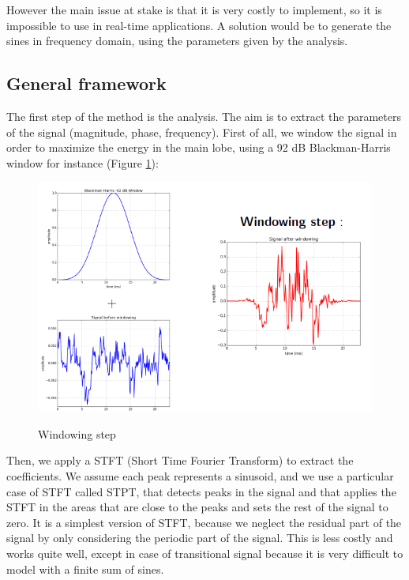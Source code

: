 \documentclass[]{article}
\begin{document}
\medskip
However the main issue at stake is that it is very costly to implement, so it is impossible to use in real-time applications. A solution would be to generate the sines in frequency domain, using the parameters given by the analysis.

\subsection{General framework}\label{sec:general-framework}

The first step of the method is the analysis. The aim is to extract the parameters of the signal (magnitude, phase, frequency).
First of all, we window the signal in order to maximize the energy in the main lobe, using a 92 dB Blackman-Harris window for instance (Figure \ref{windowing}):

\begin{figure}[H]
	\centering
	{\includegraphics[scale=0.4]{slide1.png}}
	\caption{Windowing step}
	\label{windowing}
\end{figure}

\medskip

Then, we apply a STFT (Short Time Fourier Transform) to extract the coefficients.  We assume each peak represents a sinusoid, and we use a particular case of STFT called STPT, that detects peaks in the signal and that applies the STFT in the areas that are close to the peaks and sets the rest of the signal to zero. It is a simplest version of STFT, because we neglect the residual part of the signal by only considering the periodic part of the signal. This is less costly and works quite well, except in case of transitional signal because it is very difficult to model with a finite sum of sines. 
\end{document}
